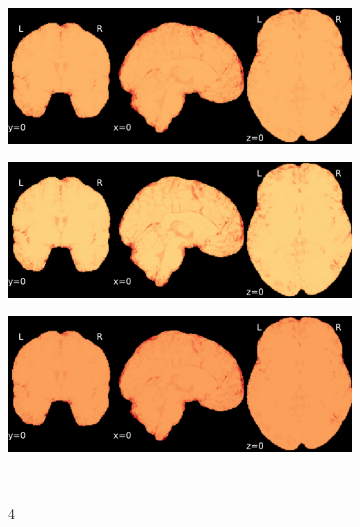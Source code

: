 \documentclass{article}
\begin{document}
\begin{appendices}
\begin{landscape}
\begin{figure}
\begin{subfigure}[t]{0.2\paperheight}
            \end{subfigure}
            \begin{subfigure}[t]{0.2\paperheight}
                \centering
                \includegraphics[width=\textwidth]{figures/sig/0mm/rr_ds000256_sub-CTS201_sig.pdf}
            \end{subfigure}
            \begin{subfigure}[t]{0.2\paperheight}
                \centering
                \includegraphics[width=\textwidth]{figures/sig/0mm/rs_ds000256_sub-CTS201_sig.pdf}
            \end{subfigure}
            \begin{subfigure}[t]{0.2\paperheight}
                \centering
                \includegraphics[width=\textwidth]{figures/sig/0mm/rr.rs_ds000256_sub-CTS201_sig.pdf}
            \end{subfigure} \\
            \begin{subfigure}[b][][c]{0.01\paperwidth} 4 \vspace*{15pt} \end{subfigure}

\end{figure}
\end{landscape}
\end{appendices}
\end{document}
